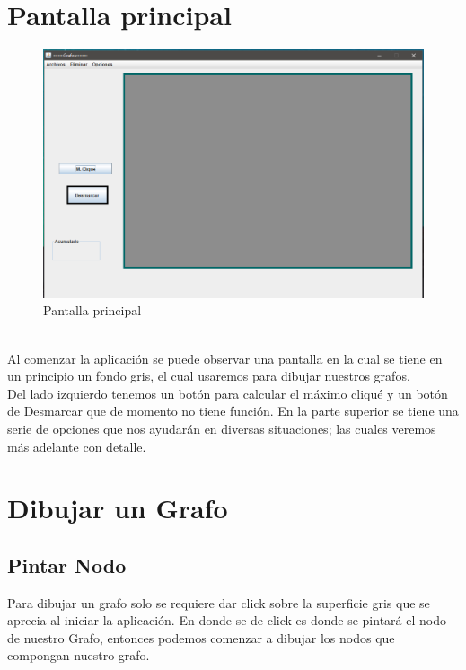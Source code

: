 \section{Pantalla principal}

\begin{figure}[h!]
\centering
\includegraphics[scale=.6]{img/principal.png}
\caption{Pantalla principal}
\label{Comandos}
\end{figure}
\\
Al comenzar la aplicación se puede observar una pantalla en la cual se tiene en un principio un fondo gris, el cual usaremos para dibujar nuestros grafos. 
\\
Del lado izquierdo tenemos un botón para calcular el máximo cliqué y un botón de Desmarcar que de momento no tiene función. En la parte superior se tiene una serie de opciones que nos ayudarán en diversas situaciones; las cuales veremos más adelante con detalle.

\section{Dibujar un Grafo}
\subsection{Pintar Nodo}
Para dibujar un grafo solo se requiere dar click sobre la superficie gris que se aprecia al iniciar la aplicación. 
En donde se de click es donde se pintará el nodo de nuestro Grafo, entonces podemos comenzar a dibujar los nodos que compongan nuestro grafo. 


